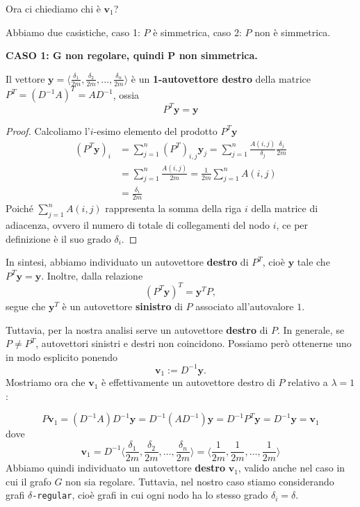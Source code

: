 Ora ci chiediamo chi è $\mathbf{v}_1$?

Abbiamo due casistiche, caso 1: $P$ è simmetrica, caso 2: $P$ non è simmetrica.

\textbf{CASO 1: $\mathbf{G}$ non regolare, quindi $\mathbf{P}$ non simmetrica.}

\begin{lemma}\label{lemma:right_eigenvector}
    Il vettore $\mathbf{y} = \langle \frac{\delta_1}{2m}, \frac{\delta_2}{2m}, \dots, \frac{\delta_n}{2m} \rangle$ è un \textbf{1-autovettore destro} della matrice $P^T = (D^{-1}A)^T = AD^{-1}$, ossia
    \[
        P^T\mathbf{y} = \mathbf{y}
    \]
    \begin{proof}
        Calcoliamo l'$i$-esimo elemento del prodotto $P^T\mathbf{y}$
        \begin{align*}
            \left(P^T\mathbf{y} \right)_i &= \sum_{j = 1}^{n} \left(P^T\right)_{i,j}\mathbf{y}_j
            = \sum_{j = 1}^{n} \frac{A(i, j)}{\delta_j}\frac{\delta_j}{2m} \\
            &= \sum_{j = 1}^{n} \frac{A(i, j)}{2m} = \frac{1}{2m}\sum_{j = 1}^{n} A(i, j) \\
            &= \frac{\delta_i}{2m}
        \end{align*}
        Poiché $\sum_{j = 1}^{n} A(i, j)$ rappresenta la somma della riga $i$ della matrice di adiacenza, ovvero il numero di totale di collegamenti del nodo $i$, ce per definizione è il suo grado $\delta_i$.
    \end{proof}
\end{lemma}
In sintesi, abbiamo individuato un autovettore \textbf{destro} di $P^T$, cioè $\mathbf{y}$ tale che $P^T\mathbf{y}=\mathbf{y}$. Inoltre, dalla relazione
\[
\left(P^T\mathbf{y}\right)^T=\mathbf{y}^TP,
\]
segue che $\mathbf{y}^T$ è un autovettore \textbf{sinistro} di $P$ associato all'autovalore $1$.

Tuttavia, per la nostra analisi serve un autovettore \textbf{destro} di $P$. In generale, se $P\neq P^T$, autovettori sinistri e destri non coincidono. Possiamo però ottenerne uno in modo esplicito ponendo
\[
\mathbf{v}_1:=D^{-1}\mathbf{y}.
\]
Mostriamo ora che $\mathbf{v}_1$ è effettivamente un autovettore destro di $P$ relativo a $\lambda=1$:

\[
    P\mathbf{v}_1 = (D^{-1}A)D^{-1}\mathbf{y} = D^{-1}(AD^{-1})\mathbf{y} = D^{-1}P^T\mathbf{y} = D^{-1}\mathbf{y} = \mathbf{v}_1
\]
dove
\[
    \mathbf{v}_1 = D^{-1}\langle \frac{\delta_1}{2m}, \frac{\delta_2}{2m}, \dots, \frac{\delta_n}{2m} \rangle = \langle \frac{1}{2m}, \frac{1}{2m}, \dots, \frac{1}{2m} \rangle
\]
Abbiamo quindi individuato un autovettore \textbf{destro} $\mathbf{v}_1$, valido anche nel caso in cui il grafo $G$ non sia regolare. Tuttavia, nel nostro caso stiamo considerando grafi $\delta$\texttt{-regular}, cioè grafi in cui ogni nodo ha lo stesso grado $\delta_i = \delta$. 

